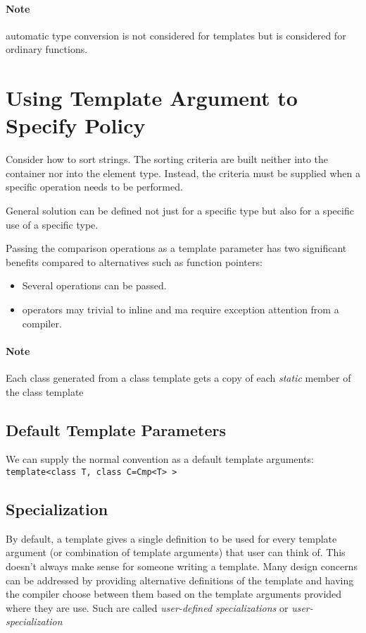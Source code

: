 \documentclass[11pt, a4paper]{book}
\begin{document}
\paragraph{Note} automatic type conversion is not considered for templates but is considered for ordinary functions.
\section{Using Template Argument to Specify Policy }
Consider how to sort strings. The sorting criteria are built neither into the container nor into the element type. Instead, the criteria must be supplied when a specific operation needs to be performed. 

General solution can be defined not just for a specific type but also for a specific use of a specific type. 

Passing the comparison operations as a template parameter has two significant benefits compared to alternatives such as function pointers:
\begin{itemize}
	\item Several operations can be passed.
	\item operators may trivial to inline and ma require exception attention from a compiler.
\end{itemize}
\paragraph{Note} Each class generated from a class template gets a copy of each \emph{static} member of the class template

\subsection{Default Template Parameters}
We can supply the normal convention as a default template arguments:\\
\verb|template<class T, class C=Cmp<T> >|

\subsection{Specialization}
By default, a template gives a single definition to be used for every template argument (or combination of template arguments) that user can think of. This doesn't always make sense for someone writing a template. Many design concerns can be addressed by providing alternative definitions of the template and having the compiler choose between them based on the template arguments provided where they are use. Such are called \emph{user-defined specializations} or \emph{user-specialization}
\end{document}
